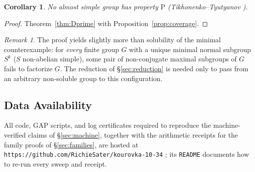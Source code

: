 \documentclass[11pt]{amsart}
\newtheorem{corollary}[theorem]{Corollary}
\theoremstyle{definition}
\theoremstyle{remark}
\newtheorem{remark}[theorem]{Remark}
\begin{document}
\begin{corollary}
No almost simple group has property $\mathrm{P}$
(Tikhonenko--Tyutyanov \cite{TT2010}).
\end{corollary}

\begin{proof}
Theorem~\ref{thm:Dprime} with Proposition~\ref{prop:coverage}.
\end{proof}

\begin{remark}
The proof yields slightly more than solubility of the minimal
counterexample: for \emph{every} finite group $G$ with a unique minimal
normal subgroup $S^k$ ($S$ non-abelian simple), some pair of
non-conjugate maximal subgroups of $G$ fails to factorize $G$. The
reduction of \S\ref{sec:reduction} is needed only to pass from an
arbitrary non-soluble group to this configuration.
\end{remark}

\subsection*{Data Availability}
All code, GAP scripts, and log certificates required to reproduce the
machine-verified claims of \S\ref{sec:machine}, together with the
arithmetic receipts for the family proofs of \S\ref{sec:families}, are
hosted at
\texttt{https://github.com/RichieSater/kourovka-10-34} \cite{Repo}; its
\texttt{README} documents how to re-run every sweep and receipt.
\end{document}
